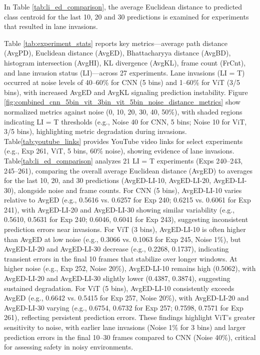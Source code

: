 In Table \ref{tab:li_ed_comparison}, the average Euclidean distance to predicted class centroid for the last 10, 20 and 30 predictions is examined for experiments that resulted in lane invasions. 

Table \ref{tab:experiment_stats} reports key metrics—average path distance (AvgPD), Euclidean distance (AvgED), Bhattacharyya distance (AvgBD), histogram intersection (AvgHI), KL divergence (AvgKL), frame count (FrCnt), and lane invasion status (LI)—across 27 experiments. Lane invasions (LI = T) occurred at noise levels of 40–60\% for CNN (5 bins) and 1–60\% for ViT (3/5 bins), with increased AvgED and AvgKL signaling prediction instability. Figure \ref{fig:combined_cnn_5bin_vit_3bin_vit_5bin_noise_distance_metrics} show normalized metrics against noise (0, 10, 20, 30, 40, 50\%), with shaded regions indicating LI = T thresholds (e.g., Noise 40 for CNN, 5 bins; Noise 10 for ViT, 3/5 bins), highlighting metric degradation during invasions. Table\ref{tab:youtube_links} provides YouTube video links for select experiments (e.g., Exp 261, ViT, 5 bins, 60\% noise), showing evidence of lane invasions. Table\ref{tab:li_ed_comparison} analyzes 21 LI = T experiments (Exps 240–243, 245–261), comparing the overall average Euclidean distance (AvgED) to averages for the last 10, 20, and 30 predictions (AvgED-LI-10, AvgED-LI-20, AvgED-LI-30), alongside noise and frame counts. For CNN (5 bins), AvgED-LI-10 varies relative to AvgED (e.g., 0.5616 vs. 0.6257 for Exp 240; 0.6215 vs. 0.6061 for Exp 241), with AvgED-LI-20 and AvgED-LI-30 showing similar variability (e.g., 0.5610, 0.5631 for Exp 240; 0.6046, 0.6041 for Exp 243), suggesting inconsistent prediction errors near invasions. For ViT (3 bins), AvgED-LI-10 is often higher than AvgED at low noise (e.g., 0.3066 vs. 0.1063 for Exp 245, Noise 1\%), but AvgED-LI-20 and AvgED-LI-30 decrease (e.g., 0.2268, 0.1737), indicating transient errors in the final 10 frames that stabilize over longer windows. At higher noise (e.g., Exp 252, Noise 20\%), AvgED-LI-10 remains high (0.5062), with AvgED-LI-20 and AvgED-LI-30 slightly lower (0.4387, 0.3874), suggesting sustained degradation. For ViT (5 bins), AvgED-LI-10 consistently exceeds AvgED (e.g., 0.6642 vs. 0.5415 for Exp 257, Noise 20\%), with AvgED-LI-20 and AvgED-LI-30 varying (e.g., 0.6754, 0.6732 for Exp 257; 0.7598, 0.7571 for Exp 261), reflecting persistent prediction errors. These findings highlight ViT’s greater sensitivity to noise, with earlier lane invasions (Noise 1\% for 3 bins) and larger prediction errors in the final 10–30 frames compared to CNN (Noise 40\%), critical for assessing safety in noisy environments.

